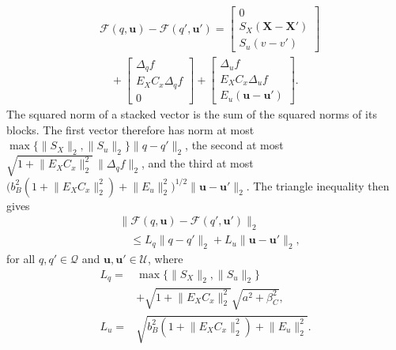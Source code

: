 \documentclass[journal]{IEEEtran}
\newcommand{\vu}{\mathbf{u}}
\newcommand{\mX}{\mathbf{X}}
\newcommand{\norm}[2][]{\mathopen{#1\lVert}#2\mathclose{#1\rVert}}
\theoremstyle{plain}
\theoremstyle{definition}
\theoremstyle{definition}
\begin{document}
\begin{equation*}
\begin{aligned}
&\mathcal F(q,\vu)-\mathcal F(q',\vu')
=\begin{bmatrix}0\\ S_X(\mX-\mX')\\ S_u(v-v')\end{bmatrix}\\
&\quad+\begin{bmatrix}\Delta_qf\\ E_XC_x\Delta_qf\\ 0\end{bmatrix}
+\begin{bmatrix}\Delta_uf\\ E_XC_x\Delta_uf\\ E_u(\vu-\vu')\end{bmatrix}.
\end{aligned}
\end{equation*}
The squared norm of a stacked vector is the sum of the squared norms
of its blocks. The first vector therefore has norm at most
$\max\{\norm{S_X}_2,\norm{S_u}_2\}\norm{q-q'}_2$, the second at most
$\sqrt{1+\norm{E_XC_x}_2^2}\,\norm{\Delta_qf}_2$, and the third at most
$\big(b_B^2(1+\norm{E_XC_x}_2^2)+\norm{E_u}_2^2\big)^{1/2}
\norm{\vu-\vu'}_2$. The triangle inequality then gives
\begin{equation}
\begin{aligned}
&\norm{\mathcal F(q,\vu)-\mathcal F(q',\vu')}_2\\
&\quad\le L_q\norm{q-q'}_2+L_u\norm{\vu-\vu'}_2,
\end{aligned}
\label{eq:augmented_lipschitz}
\end{equation}
for all $q,q'\in\mathcal Q$ and $\vu,\vu'\in\mathcal U$, where
\begin{equation}
\begin{aligned}
L_q={}&\max\{\norm{S_X}_2,\norm{S_u}_2\}\\
&+\sqrt{1+\norm{E_XC_x}_2^2}\sqrt{a^2+\beta_C^2},\\
L_u={}&\sqrt{b_B^2(1+\norm{E_XC_x}_2^2)+\norm{E_u}_2^2}.
\end{aligned}
\label{eq:augmented_lipschitz_constants}
\end{equation}
\end{document}
